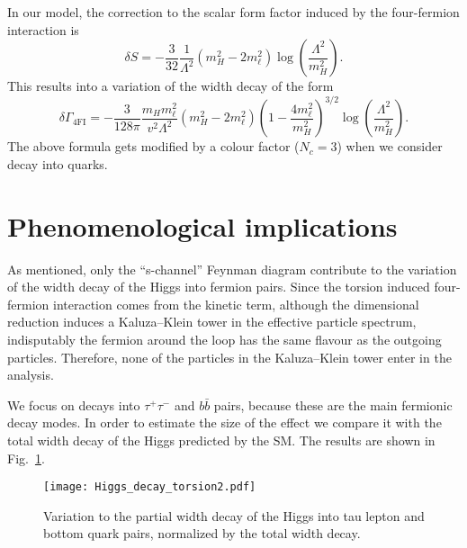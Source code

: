 \documentclass{ws-mpla}
\renewcommand{\(}{\left(}
\renewcommand{\)}{\right)}
\renewcommand{\[}{\left[}
\renewcommand{\]}{\right]}
\begin{document}
In our model, the correction to the scalar form factor induced by the four-fermion interaction is
\begin{equation}
  \delta S = - \frac{3}{32} \frac{1}{\Lambda^2} \( m_H^2 - 2 m_\ell^2 \) \log\( \frac{\Lambda^2}{m_H^2} \).
\end{equation}
This results into a variation of the width decay  of the form
\begin{equation}
  \delta \Gamma_{\text{4FI}} = -\frac{3}{128 \pi} \frac{ m_H m_\ell^2}{v^2 \Lambda^2} \( m_H^2 - 2 m_\ell^2 \) \( 1 - \frac{4 m_\ell^2}{m_H^2} \)^{3/2} \log\( \frac{\Lambda^2}{m_H^2} \) .
\end{equation}
The above formula gets modified by a colour factor ($N_c = 3$) when we consider decay into quarks.


\section{Phenomenological implications}\label{phenom}

As mentioned, only the ``s-channel'' Feynman diagram contribute to the variation of the width decay of the Higgs into fermion pairs. Since the torsion induced four-fermion interaction comes from the kinetic term, although the dimensional reduction induces a Kaluza--Klein tower in the effective particle spectrum, indisputably the fermion around the loop has the same flavour as the outgoing particles. Therefore, none of the particles in the Kaluza--Klein tower enter in the analysis.

We focus on decays into $\tau^+ \tau^-$ and $b \bar{b}$ pairs, because these are the main fermionic decay modes. In order to estimate the size of the effect we compare it with the total width decay of the Higgs predicted by the SM. The results are shown in Fig.~\ref{fig:Hdt}.
\begin{figure}[hbt]
  \begin{center}
    \texttt{[image: Higgs\_decay\_torsion2.pdf]} 
  \end{center}
  \caption{Variation to the partial width decay of the Higgs into tau lepton and bottom quark pairs, normalized by the total width decay.}
  \label{fig:Hdt}
\end{figure}
\end{document}
